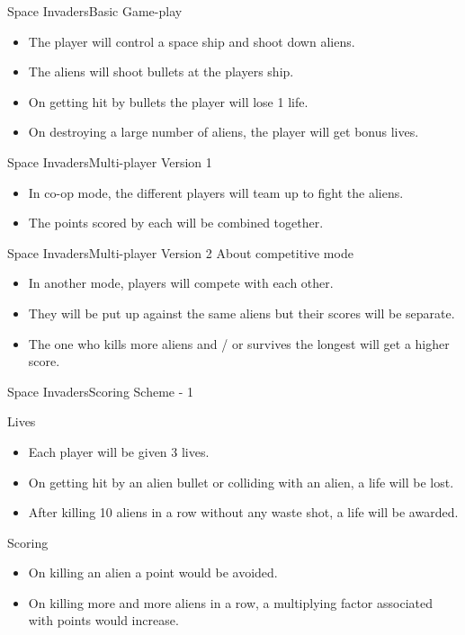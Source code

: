 \documentclass{beamer}
\begin{document}
\begin{frame}{Space Invaders}{Basic Game-play}
  \begin{itemize}
  	\item The player will control a space ship and shoot down aliens.
  	\item The aliens will shoot bullets at the players ship.
  	\item On getting hit by bullets the player will lose 1 life.
  	\item On destroying a large number of aliens, the player will get bonus lives.
  \end{itemize}
\end{frame}

\begin{frame}{Space Invaders}{Multi-player Version 1}
	\begin{itemize}
		\item In co-op mode, the different players will team up to fight the aliens.
		\item The points scored by each will be combined together.
	\end{itemize}
\end{frame}

\begin{frame}{Space Invaders}{Multi-player Version 2}
	About competitive mode
	\begin{itemize}
		\item In another mode, players will compete with each other.
		\item They will be put up against the same aliens but their scores will be separate. 
		\item The one who kills more aliens and / or survives the longest will get a higher score.
	\end{itemize}  
\end{frame}

\begin{frame}{Space Invaders}{Scoring Scheme - 1}
	\begin{block}{Lives}
		\begin{itemize}
			\item Each player will be given 3 lives.
			\item On getting hit by an alien bullet or colliding with an alien, a life will be lost.
			\item After killing 10 aliens in a row without any waste shot, a life will be awarded.
		\end{itemize}
	\end{block}
	
	\begin{block}{Scoring}
		\begin{itemize}
			\item On killing an alien a point would be avoided.
			\item On killing more and more aliens in a row, a multiplying factor associated with points would increase.
		\end{itemize}
	\end{block}
\end{frame}
\end{document}
